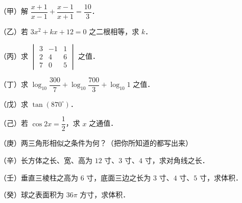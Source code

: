 

\par\medskip


\begin{question}
（甲）解 $\dfrac{x+1}{x-1}+\dfrac{x-1}{x+1}=\dfrac{10}{3}$．

\end{question}
\begin{question}
（乙）若 $3x^2+kx+12=0$ 之二根相等，求 $k$．

\end{question}
\begin{question}
（丙）求 $\begin{vmatrix}3&-1&1\\2&4&6\\7&0&5\end{vmatrix}$ 之值．

\end{question}
\begin{question}
（丁）求 $\log_{10}\dfrac{300}{7}+\log_{10}\dfrac{700}{3}+\log_{10}1$ 之值．

\end{question}
\begin{question}
（戊）求 $\tan(870^\circ)$．

\end{question}
\begin{question}
（己）若 $\cos2x=\dfrac12$，求 $x$ 之通值．

\end{question}
\begin{question}
（庚）两三角形相似之条件为何？（把你所知道的都写出来）

\end{question}
\begin{question}
（辛）长方体之长、宽、高为 $12$ 寸、$3$ 寸、$4$ 寸，求对角线之长．

\end{question}
\begin{question}
（壬）垂直三棱柱之高为 $6$ 寸，底面三边之长为 $3$ 寸、$4$ 寸、$5$ 寸，求体积．

\end{question}
\begin{question}
（癸）球之表面积为 $36\pi$ 方寸，求体积．

\par\medskip

\end{question}


